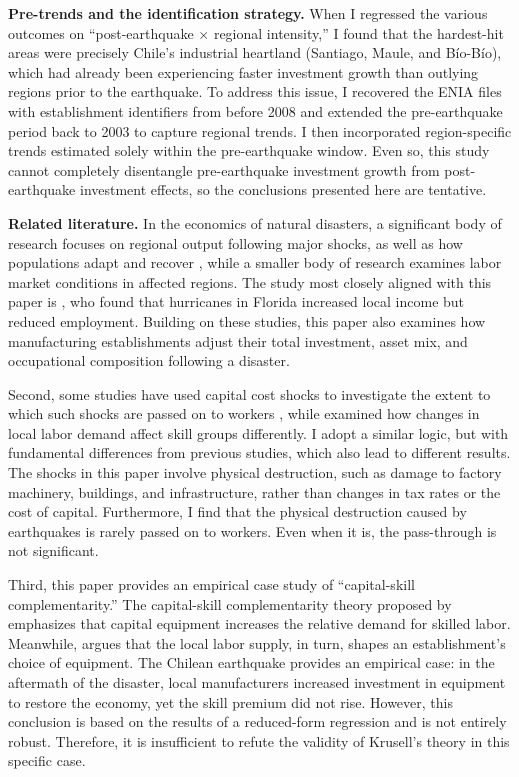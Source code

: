 \documentclass[12pt]{article}
\begin{document}
\textbf{Pre-trends and the identification strategy.} When I regressed the various outcomes on
``post-earthquake $\times$ regional intensity,'' I found that the hardest-hit areas were precisely
Chile's industrial heartland (Santiago, Maule, and B\'io-B\'io), which had already been experiencing
faster investment growth than outlying regions prior to the earthquake. To address this issue, I
recovered the ENIA files with establishment identifiers from before 2008 and extended the
pre-earthquake period back to 2003 to capture regional trends. I then incorporated region-specific
trends estimated solely within the pre-earthquake window. Even so, this study cannot completely
disentangle pre-earthquake investment growth from post-earthquake investment effects, so the
conclusions presented here are tentative.

\textbf{Related literature.} In the economics of natural disasters, a significant body of research
focuses on regional output following major shocks, as well as how populations adapt and recover
\citep{aksoy2024,diaz2024,benguria2022}, while a smaller body of research examines labor market
conditions in affected regions. The study most closely aligned with this paper is
\citet{belasen2009}, who found that hurricanes in Florida increased local income but reduced
employment. Building on these studies, this paper also examines how manufacturing establishments
adjust their total investment, asset mix, and occupational composition following a disaster.

Second, some studies have used capital cost shocks to investigate the extent to which such shocks
are passed on to workers \citep{suarezzidar2016,fuest2018}, while \citet{notowidigdo2020} examined
how changes in local labor demand affect skill groups differently. I adopt a similar logic, but
with fundamental differences from previous studies, which also lead to different results. The
shocks in this paper involve physical destruction, such as damage to factory machinery, buildings,
and infrastructure, rather than changes in tax rates or the cost of capital. Furthermore, I find
that the physical destruction caused by earthquakes is rarely passed on to workers. Even when it
is, the pass-through is not significant.

Third, this paper provides an empirical case study of ``capital-skill complementarity.'' The
capital-skill complementarity theory proposed by \citet{krusell2000} emphasizes that capital
equipment increases the relative demand for skilled labor. Meanwhile, \citet{lewis2011} argues that
the local labor supply, in turn, shapes an establishment's choice of equipment. The Chilean
earthquake provides an empirical case: in the aftermath of the disaster, local manufacturers
increased investment in equipment to restore the economy, yet the skill premium did not rise.
However, this conclusion is based on the results of a reduced-form regression and is not entirely
robust. Therefore, it is insufficient to refute the validity of Krusell's theory in this specific
case.
\end{document}
